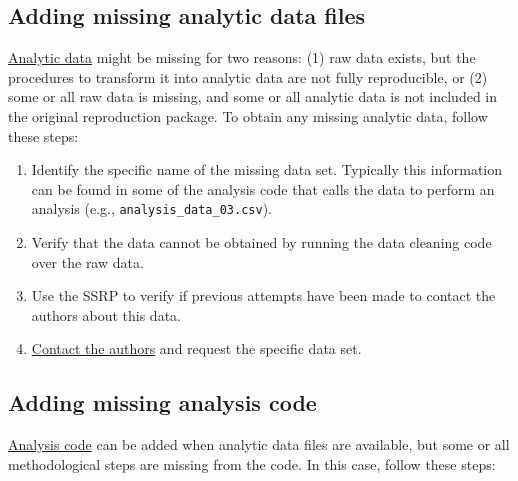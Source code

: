 \documentclass[
]{book}
\providecommand{\tightlist}{%
  \setlength{\itemsep}{0pt}\setlength{\parskip}{0pt}}
\begin{document}
\hypertarget{ad}{%
\subsection{Adding missing analytic data files}\label{ad}}

\protect\hyperlink{describe-inputs}{Analytic data} might be missing for two reasons: (1) raw data exists, but the procedures to transform it into analytic data are not fully reproducible, or (2) some or all raw data is missing, and some or all analytic data is not included in the original reproduction package. To obtain any missing analytic data, follow these steps:

\begin{enumerate}
\def\labelenumi{\arabic{enumi}.}
\tightlist
\item
  Identify the specific name of the missing data set. Typically this information can be found in some of the analysis code that calls the data to perform an analysis (e.g., \texttt{analysis\_data\_03.csv}).\\
\item
  Verify that the data cannot be obtained by running the data cleaning code over the raw data.\\
\item
  Use the SSRP to verify if previous attempts have been made to contact the authors about this data.\\
\item
  \protect\hyperlink{tips-for-communication}{Contact the authors} and request the specific data set.
\end{enumerate}

\hypertarget{ac}{%
\subsection{Adding missing analysis code}\label{ac}}

\protect\hyperlink{describe-inputs}{Analysis code} can be added when analytic data files are available, but some or all methodological steps are missing from the code. In this case, follow these steps:
\end{document}
